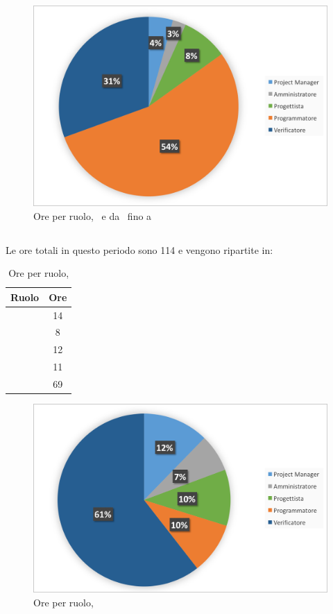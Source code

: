 \begin{figure}[H]
	\centering 
	\includegraphics[scale=0.7]{Immagini/GraficiTorte/COD.png}
	\caption{Ore per ruolo, \PD\ e \COD da \RP\ fino a \RQ}
\end{figure}

\newpage
\subsection{\VV}
Le ore totali in questo periodo sono 114 e vengono ripartite in:

\begin{table}[h]
	\begin{center}
		\begin{tabular}{|c|c|}
			\hline
			\textbf{Ruolo}	& \textbf{Ore} \\
			\hline
			\Pm &	14\\
			\hline
			\Am	&	8\\
			\hline
			\Prog		&	12\\
			\hline
			\Progr & 11\\
			\hline
			\Ver	&	69\\
			\hline
		\end{tabular}
	\end{center}
	\caption{Ore per ruolo, \VV}
\end{table}

\begin{figure}[H]
	\centering 
	\includegraphics[scale=0.7]{Immagini/GraficiTorte/VV.png}
	\caption{Ore per ruolo, \VV}
\end{figure}
\newpage
